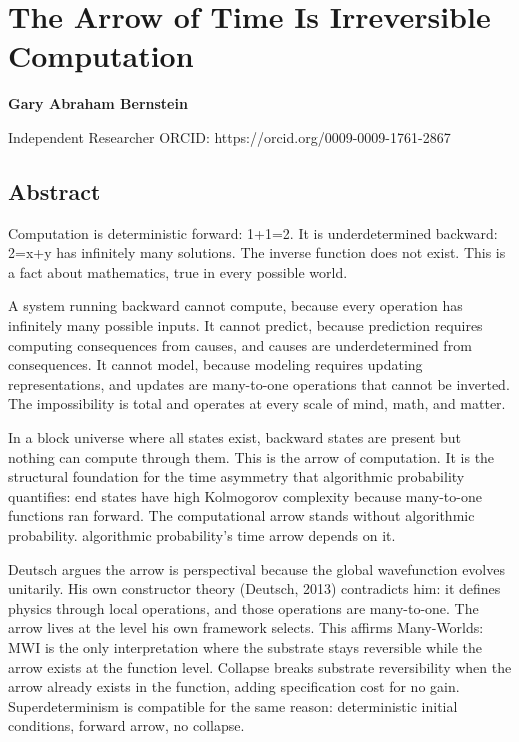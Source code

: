 \documentclass[
]{article}
\author{}
\date{}
\begin{document}
\section{The Arrow of Time Is Irreversible
Computation}\label{the-arrow-of-time-is-irreversible-computation}

\textbf{Gary Abraham Bernstein}

Independent Researcher ORCID: https://orcid.org/0009-0009-1761-2867

\subsection{Abstract}\label{abstract}

Computation is deterministic forward: 1+1=2. It is underdetermined
backward: 2=x+y has infinitely many solutions. The inverse function does
not exist. This is a fact about mathematics, true in every possible
world.

A system running backward cannot compute, because every operation has
infinitely many possible inputs. It cannot predict, because prediction
requires computing consequences from causes, and causes are
underdetermined from consequences. It cannot model, because modeling
requires updating representations, and updates are many-to-one
operations that cannot be inverted. The impossibility is total and
operates at every scale of mind, math, and matter.

In a block universe where all states exist, backward states are present
but nothing can compute through them. This is the arrow of computation.
It is the structural foundation for the time asymmetry that algorithmic
probability quantifies: end states have high Kolmogorov complexity
because many-to-one functions ran forward. The computational arrow
stands without algorithmic probability. algorithmic probability's time
arrow depends on it.

Deutsch argues the arrow is perspectival because the global wavefunction
evolves unitarily. His own constructor theory (Deutsch, 2013)
contradicts him: it defines physics through local operations, and those
operations are many-to-one. The arrow lives at the level his own
framework selects. This affirms Many-Worlds: MWI is the only
interpretation where the substrate stays reversible while the arrow
exists at the function level. Collapse breaks substrate reversibility
when the arrow already exists in the function, adding specification cost
for no gain. Superdeterminism is compatible for the same reason:
deterministic initial conditions, forward arrow, no collapse.
\end{document}
